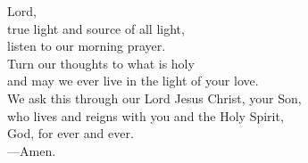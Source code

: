 \prayer


\begin{prayerverse}
Lord,\\
true light and source of all light,\\
listen to our morning prayer.\\
Turn our thoughts to what is holy\\
and may we ever live in the light of your love.\\
We ask this through our Lord Jesus Christ, your Son,\\
who lives and reigns with you and the Holy Spirit,\\
God, for ever and ever.\\
{\color{red}---\thinspace}Amen.
\end{prayerverse}

